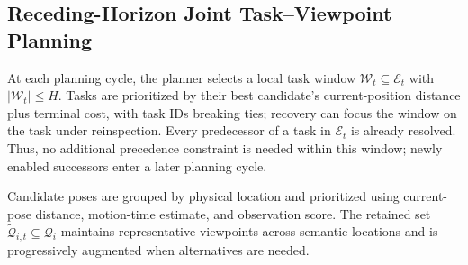 \documentclass[letterpaper,10pt,journal]{IEEEtran}
\begin{document}
\subsection{Receding-Horizon Joint Task--Viewpoint Planning}

At each planning cycle, the planner selects a local task window $\mathcal W_t\subseteq\mathcal E_t$ with $|\mathcal W_t|\leq H$. Tasks are prioritized by their best candidate's current-position distance plus terminal cost, with task IDs breaking ties; recovery can focus the window on the task under reinspection. Every predecessor of a task in $\mathcal E_t$ is already resolved. Thus, no additional precedence constraint is needed within this window; newly enabled successors enter a later planning cycle.

Candidate poses are grouped by physical location and prioritized using current-pose distance, motion-time estimate, and observation score. The retained set $\widetilde{\mathcal Q}_{i,t}\subseteq\mathcal Q_i$ maintains representative viewpoints across semantic locations and is progressively augmented when alternatives are needed.
\end{document}
